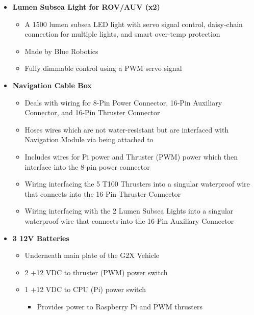 \documentclass[12pt]{article}
\begin{document}
{{\begin{itemize}
\begin{itemize}
\begin{itemize}
						\item Over 5 lbs of thrust
						\item Durable enough for great ocean depths
						\item Brushless electric motor (PWM servo signal)
					\end{itemize}
					\item[] \textbf{Lumen Subsea Light for ROV/AUV (x2)}
					\begin{itemize}
						\item A 1500 lumen subsea LED light with servo signal control, daisy-chain connection for multiple lights, and smart over-temp protection
						\item Made by Blue Robotics
						\item Fully dimmable control using a PWM servo signal
					\end{itemize}
					\item[] \textbf{Navigation Cable Box}
					\begin{itemize}
						\item Deals with wiring for 8-Pin Power Connector, 16-Pin Auxiliary Connector, and 16-Pin Thruster Connector
						\item Hoses wires which are not water-resistant but are interfaced with Navigation Module via being attached to 
						\item Includes wires for Pi power and Thruster (PWM) power which then interface into the 8-pin power connector
						\item Wiring interfacing the 5 T100 Thrusters into a singular waterproof wire that connects into the 16-Pin Thruster Connector
						\item Wiring interfacing with the 2 Lumen Subsea Lights into a singular waterproof wire that connects into the 16-Pin Auxiliary Connector
					\end{itemize}
					\item[] \textbf{3 12V Batteries}
					\begin{itemize}
						\item Underneath main plate of the G2X Vehicle
						\item 2 +12 VDC to thruster (PWM) power switch
						\item 1 +12 VDC to CPU (Pi) power switch
						\begin{itemize}
							\item Provides power to Raspberry Pi and PWM thrusters
						\end{itemize}
					\end{itemize}

\end{itemize}
\end{itemize}}}
\end{document}
